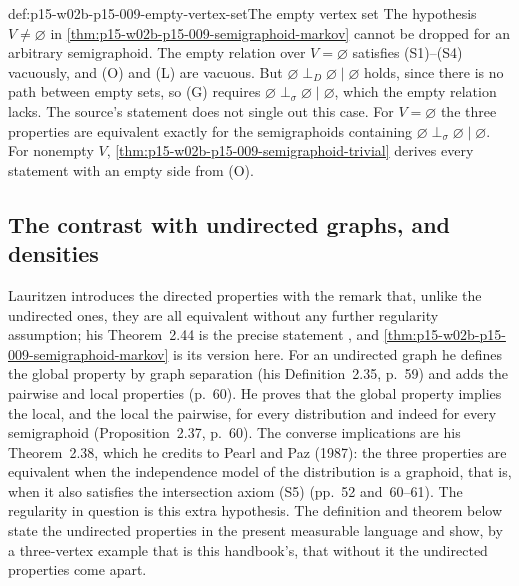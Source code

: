 \begin{hbwarning}{def:p15-w02b-p15-009-empty-vertex-set}{The empty vertex set}
The hypothesis \(V\neq\varnothing\) in
\cref{thm:p15-w02b-p15-009-semigraphoid-markov} cannot be dropped for
an arbitrary semigraphoid. The empty relation over \(V=\varnothing\)
satisfies (S1)--(S4) vacuously, and (O) and (L) are vacuous. But
\(\varnothing\mathrel{\perp_D}\varnothing\mid\varnothing\) holds, since
there is no path between empty sets, so (G) requires
\(\varnothing\perp_\sigma\varnothing\mid\varnothing\), which the empty
relation lacks. The source's statement does not single out this case.
For \(V=\varnothing\) the three properties are equivalent exactly for
the semigraphoids containing
\(\varnothing\perp_\sigma\varnothing\mid\varnothing\). For nonempty
\(V\), \cref{thm:p15-w02b-p15-009-semigraphoid-trivial} derives every
statement with an empty side from (O).
\end{hbwarning}

\subsection{The contrast with undirected graphs, and densities}

Lauritzen introduces the directed properties with the remark that, unlike
the undirected ones, they are all equivalent without any further
regularity assumption; his Theorem~2.44 is the precise statement
\cite[Sec.~2.6.2, p.~65]{Lauritzen2019GraphicalLectures2020}, and
\cref{thm:p15-w02b-p15-009-semigraphoid-markov} is its version here. For
an undirected graph he defines the global property by graph separation
(his Definition~2.35, p.~59) and adds the pairwise and local properties
(p.~60). He proves that the global property implies the local, and the
local the pairwise, for every distribution and indeed for every
semigraphoid (Proposition~2.37, p.~60). The converse implications are his
Theorem~2.38, which he credits to Pearl and Paz (1987): the three
properties are equivalent when the independence model of the distribution
is a graphoid, that is, when it also satisfies the intersection axiom
(S5) (pp.~52 and~60--61). The regularity in question is this extra
hypothesis. The definition and theorem below state the undirected
properties in the present measurable language and show, by a three-vertex
example that is this handbook's, that without it the undirected
properties come apart.

